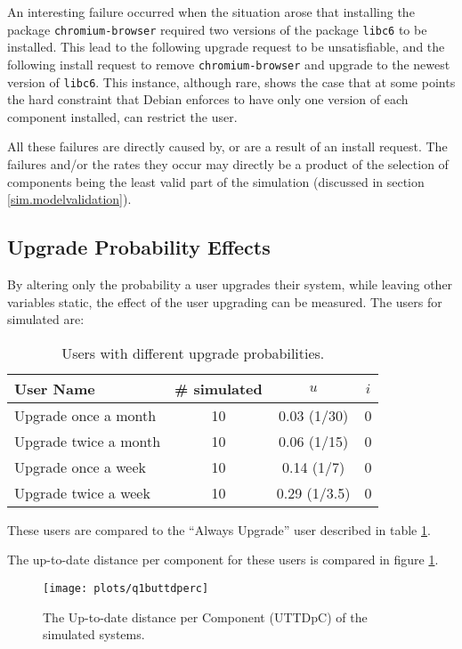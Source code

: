 An interesting failure occurred when the situation arose that installing the package \texttt{chromium-browser} required two versions of the package \texttt{libc6} to be installed. 
This lead to the following upgrade request to be unsatisfiable, and the following install request to remove \texttt{chromium-browser} and upgrade to the newest version of \texttt{libc6}.
This instance, although rare, shows the case that at some points the hard constraint that Debian enforces to have only one version of each component installed,
can restrict the user.

All these failures are directly caused by, or are a result of an install request.
The failures and/or the rates they occur may directly be a product of the selection of components being the least valid part of the simulation (discussed in section \ref{sim.modelvalidation}).

\subsection{Upgrade Probability Effects}
By altering only the probability a user upgrades their system, while leaving other variables static, the effect of the user upgrading can be measured.
The users for simulated are:
\begin{table}[h!]
\centering
\begin{tabular}{|l | c | c | c |}
\hline
User Name 				& \# simulated 	& $u$ 		& $i$ 			\\ \hline
Upgrade once a month	& 10 			& 0.03 (1/30)			& 0				 \\
Upgrade twice a month	& 10 			& 0.06 (1/15)		& 0				\\
Upgrade once a week		& 10 			& 0.14 (1/7)		& 0				 \\
Upgrade twice a week 	& 10 			& 0.29 (1/3.5)		& 0				\\ \hline
\end{tabular}
\caption{Users with different upgrade probabilities.}
\label{exp.tblextremeusers}
\end{table}
These users are compared to the ``Always Upgrade'' user described in table \ref{exp.tblextremeusers}.

The up-to-date distance per component for these users is compared in figure \ref{exp.q1buttdperc}.
\begin{figure}[htp]
\begin{center}
  \texttt{[image: plots/q1buttdperc]}
  \caption{The Up-to-date distance per Component (UTTDpC) of the simulated systems.}
  \label{exp.q1buttdperc}
\end{center}
\end{figure}

